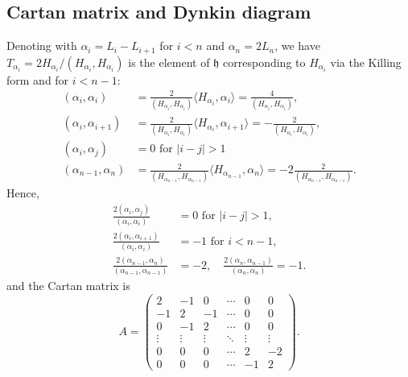 \documentclass{report}
\begin{document}
\subsection{Cartan matrix and Dynkin diagram}
Denoting with $\alpha_i = L_i - L_{i+1}$ for $i<n$ and $\alpha_n = 2L_n$, we have $T_{\alpha_i} = 2H_{\alpha_i}/(H_{\alpha_i}, H_{\alpha_i})$ is the element of $\mathfrak h $ corresponding to $H_{\alpha_i}$ via the Killing form and for $i < n-1$:
\begin{align*}
    (\alpha_i, \alpha_i) &= \frac{2}{(H_{\alpha_i}, H_{\alpha_i})} \langle H_{\alpha_i}, \alpha_i \rangle = \frac{4}{(H_{\alpha_i}, H_{\alpha_i})},\\
    (\alpha_i, \alpha_{i+1}) &= \frac{2}{(H_{\alpha_i}, H_{\alpha_i})} \langle H_{\alpha_i}, \alpha_{i+1} \rangle = -\frac{2}{(H_{\alpha_i}, H_{\alpha_i})},\\
    (\alpha_i, \alpha_j) &= 0 \text{ for } |i-j| > 1\\
    (\alpha_{n-1}, \alpha_n) &= \frac{2}{(H_{\alpha_{n-1}}, H_{\alpha_{n-1}})} \langle H_{\alpha_{n-1}}, \alpha_n \rangle = -2 \frac{2}{(H_{\alpha_{n-1}}, H_{\alpha_{n-1}})}.
\end{align*}
Hence,
\begin{align*}
    \frac{2(\alpha_i, \alpha_j)}{(\alpha_i, \alpha_i)} &= 0 \text{ for } |i-j| > 1,\\
    \frac{2(\alpha_{i}, \alpha_{i+1})}{(\alpha_i, \alpha_i)} &= -1 \text{ for } i < n-1,\\
    \frac{2(\alpha_{n-1}, \alpha_n)}{(\alpha_{n-1}, \alpha_{n-1})} &= -2,\quad \frac{2(\alpha_n, \alpha_{n-1})}{(\alpha_n, \alpha_n)} = -1.
\end{align*}
and the Cartan matrix is
\[
A = \begin{pmatrix}
    2 & -1 & 0 & \cdots & 0 & 0\\
    -1 & 2 & -1 & \cdots & 0 & 0\\
    0 & -1 & 2 & \cdots & 0 & 0\\
    \vdots & \vdots & \vdots & \ddots & \vdots &\vdots\\
    0 & 0 & 0 & \cdots & 2 & -2\\
    0 & 0 & 0 & \cdots & -1 & 2
\end{pmatrix}.
\]
\end{document}
